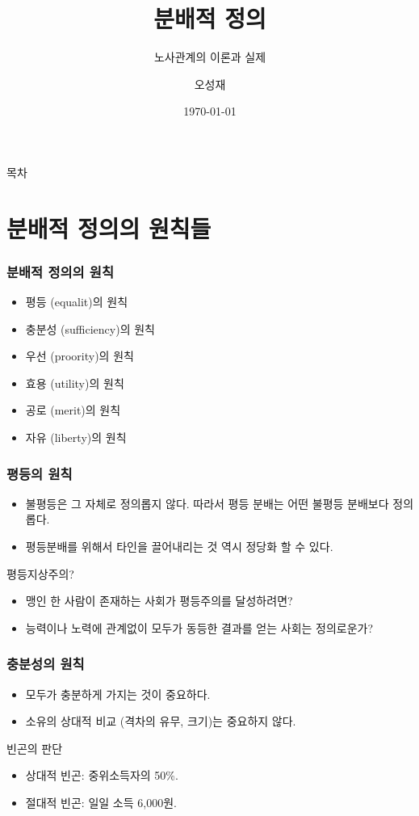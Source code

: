 \documentclass[aspectratio=169,xcolor=dvipsnames,handout]{beamer}
\title[]{분배적 정의} %
\subtitle{노사관계의 이론과 실제}
\author[]{오성재}
\institute[CNU] %
{%
    충남대학교 경제학과\\
}
\date{\today}
\begin{document}
\begin{frame}
    \titlepage%
\end{frame}

\begin{frame}{목차}
    \tableofcontents
\end{frame}

\section{분배적 정의의 원칙들}
\begin{frame}[<+->]
\frametitle{분배적 정의의 원칙}
    \begin{itemize}
        \item 평등 (equalit)의 원칙
        \item 충분성 (sufficiency)의 원칙
        \item 우선 (proority)의 원칙
        \item 효용 (utility)의 원칙
        \item 공로 (merit)의 원칙
        \item 자유 (liberty)의 원칙
    \end{itemize}
\end{frame}

\begin{frame}[<+->]
\frametitle{평등의 원칙}
    \begin{itemize}
        \item 불평등은 그 자체로 정의롭지 않다. 따라서 평등 분배는 어떤 불평등 분배보다 정의롭다.
        \item 평등분배를 위해서 타인을 끌어내리는 것 역시 정당화 할 수 있다.
    \end{itemize}
    \begin{alertblock}{평등지상주의?}
    \begin{itemize}
        \item 맹인 한 사람이 존재하는 사회가 평등주의를 달성하려면?
        \item 능력이나 노력에 관계없이 모두가 동등한 결과를 얻는 사회는 정의로운가?
    \end{itemize}
    \end{alertblock}
\end{frame}

\begin{frame}[<+->]
\frametitle{충분성의 원칙}
    \begin{itemize}
        \item 모두가 충분하게 가지는 것이 중요하다.
        \item 소유의 상대적 비교 (격차의 유무, 크기)는 중요하지 않다.
    \end{itemize}
    \begin{alertblock}{빈곤의 판단}
    \begin{itemize}
        \item 상대적 빈곤: 중위소득자의 50\%.
        \item 절대적 빈곤: 일일 소득 6,000원.
    \end{itemize}
    \end{alertblock}
\end{frame}
\end{document}
